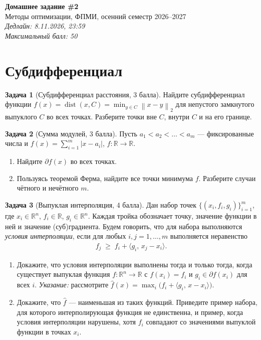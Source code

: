 \documentclass[11pt]{article}
\theoremstyle{definition}
\newtheorem{problem}{Задача}
\theoremstyle{starred}
\theoremstyle{definition}
\theoremstyle{remark}
\theoremstyle{plain}
\theoremstyle{definition}
\newcommand{\R}{\mathbb{R}}
\newcommand{\norm}[1]{\left\lVert #1 \right\rVert}
\newcommand{\iprod}[2]{\langle #1,\, #2 \rangle}
\newcommand{\pd}{\partial}
\begin{document}
\begin{center}
{\Large\bfseries Домашнее задание \#2}\\[3pt]
{\normalsize Методы оптимизации, ФПМИ, осенний семестр 2026--2027}\\[6pt]
{\normalsize\itshape Дедлайн: 8.11.2026, 23:59}\\[3pt]
{\normalsize\itshape Максимальный балл: 50}
\end{center}

\vspace{0.3cm}

\section{Субдифференциал}

\begin{problem}[Субдифференциал расстояния, 3 балла]
Найдите субдифференциал функции $f(x) = \operatorname{dist}(x, C) = \min_{y \in C}\norm{x - y}_2$
для непустого замкнутого выпуклого $C$ во всех точках. Разберите точки вне $C$, внутри $C$ и на
его границе.
\end{problem}

\begin{problem}[Сумма модулей, 3 балла] 
Пусть $a_1 < a_2 < \dots < a_m$ --- фиксированные числа и $f(x) = \sum_{i=1}^{m} |x - a_i|$,
$f \colon \R \to \R$.
\begin{enumerate}[label=(\alph*), nosep]
  \item Найдите $\pd f(x)$ во всех точках.
  \item Пользуясь теоремой Ферма, найдите все точки минимума $f$. Разберите случаи чётного и
        нечётного $m$.
\end{enumerate}
\end{problem}

\begin{problem}[Выпуклая интерполяция, 4 балла]
Дан набор точек $\{(x_i, f_i, g_i)\}_{i=1}^m$, где $x_i\in\R^n$, $f_i\in\R$, $g_i\in\R^n$. Каждая
тройка обозначает точку, значение функции в ней и значение (суб)градиента. Будем говорить, что для
набора выполняются \emph{условия интерполяции}, если для любых $i, j = 1, \ldots, m$ выполняется
неравенство
\begin{align*}
    f_j \;\ge\; f_i + \iprod{g_i}{x_j - x_i}.
\end{align*}
\begin{enumerate}[label=(\alph*), nosep]
  \item Докажите, что условия интерполяции выполнены тогда и только тогда, когда существует
        выпуклая функция $f \colon \R^{n} \to \R$ с $f(x_i) = f_i$ и $g_i \in \pd f(x_i)$ для всех
        $i$. \emph{Указание:} рассмотрите $\hat f(x) = \max_i\bigl(f_i + \iprod{g_i}{x - x_i}\bigr)$.
  \item Докажите, что $\hat f$ --- наименьшая из таких функций. Приведите пример набора, для
        которого интерполирующая функция не единственна, и пример, когда условия интерполяции
        нарушены, хотя $f_i$ совпадают со значениями выпуклой функции в точках $x_i$.
\end{enumerate}
\end{problem}
\end{document}
